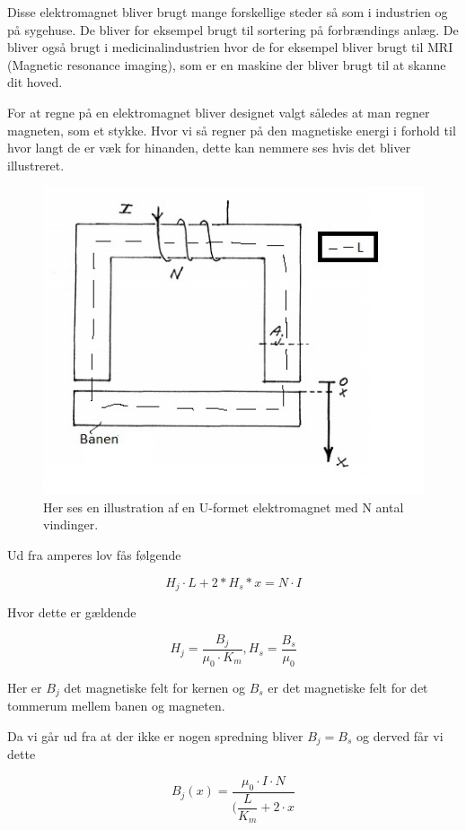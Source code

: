 Disse elektromagnet bliver brugt mange forskellige steder så som i industrien og på sygehuse. De bliver for eksempel brugt til sortering på forbrændings anlæg. De bliver også brugt i medicinalindustrien hvor de for eksempel bliver brugt til MRI (Magnetic resonance imaging), som er en maskine der bliver brugt til at skanne dit hoved.
 
For at regne på en elektromagnet bliver designet valgt således at man regner magneten, som et stykke. Hvor vi så regner på den magnetiske energi i forhold til hvor langt de er væk for hinanden, dette kan nemmere ses hvis det bliver illustreret.

\begin{figure}[h]

	\centering
		\includegraphics[scale=0.8]{Billeder/elektromagnet.jpg}
	\caption{Her ses en illustration af en U-formet elektromagnet med N antal vindinger.}
	\label{fig:elektromagnet}
\end{figure}

Ud fra amperes lov fås følgende


$$H_j \cdot L+2*H_s*x = N \cdot I$$

Hvor dette er gældende

$$H_j = \dfrac{B_j}{\mu_0 \cdot K_m}, H_s = \dfrac{B_s}{\mu_0}$$

Her er $B_j$ det magnetiske felt for kernen og $B_s$ er det magnetiske felt for det tommerum mellem banen og magneten.

Da vi går ud fra at der ikke er nogen spredning bliver $B_j = B_s$ og derved får vi dette


$$B_j(x) = \dfrac{\mu_0 \cdot I \cdot N}{(\dfrac{L}{K_m}+2 \cdot x}$$

